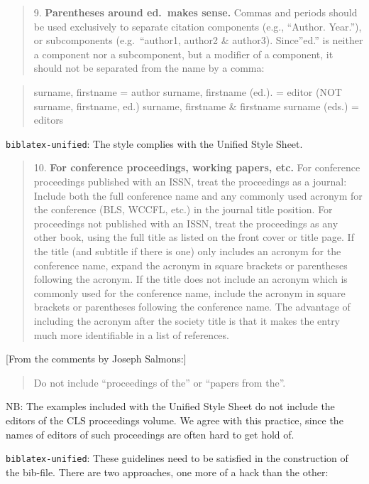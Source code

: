 \documentclass[
]{article}
\begin{document}
\begin{quote}
9. \textbf{Parentheses around ed.~makes sense.} Commas and periods
should be used exclusively to separate citation components (e.g.,
``Author. Year.''), or subcomponents (e.g.~``author1, author2 \&
author3). Since''ed.'' is neither a component nor a subcomponent, but a
modifier of a component, it should not be separated from the name by a
comma:
\end{quote}

\begin{quote}
surname, firstname = author surname, firstname (ed.). = editor (NOT
surname, firstname, ed.) surname, firstname \& firstname surname (eds.)
= editors
\end{quote}

\texttt{biblatex-unified}: The style complies with the Unified Style
Sheet.

\begin{quote}
10. \textbf{For conference proceedings, working papers, etc.} For
conference proceedings published with an ISSN, treat the proceedings as
a journal: Include both the full conference name and any commonly used
acronym for the conference (BLS, WCCFL, etc.) in the journal title
position. For proceedings not published with an ISSN, treat the
proceedings as any other book, using the full title as listed on the
front cover or title page. If the title (and subtitle if there is one)
only includes an acronym for the conference name, expand the acronym in
square brackets or parentheses following the acronym. If the title does
not include an acronym which is commonly used for the conference name,
include the acronym in square brackets or parentheses following the
conference name. The advantage of including the acronym after the
society title is that it makes the entry much more identifiable in a
list of references.
\end{quote}

{[}From the comments by Joseph Salmons:{]}

\begin{quote}
Do not include ``proceedings of the'' or ``papers from the''.
\end{quote}

NB: The examples included with the Unified Style Sheet do not include
the editors of the CLS proceedings volume. We agree with this practice,
since the names of editors of such proceedings are often hard to get
hold of.

\texttt{biblatex-unified}: These guidelines need to be satisfied in the
construction of the bib-file. There are two approaches, one more of a
hack than the other:
\end{document}

